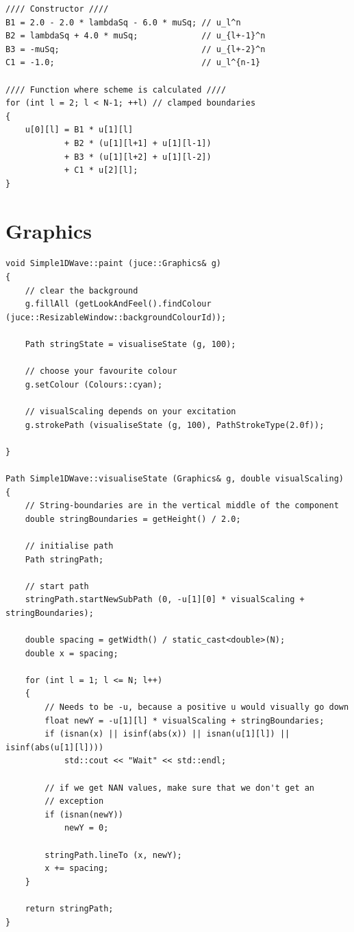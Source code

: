 \begin{lstlisting}[caption=Precalculation]
//// Constructor ////
B1 = 2.0 - 2.0 * lambdaSq - 6.0 * muSq; // u_l^n
B2 = lambdaSq + 4.0 * muSq;             // u_{l+-1}^n
B3 = -muSq;                             // u_{l+-2}^n
C1 = -1.0;                              // u_l^{n-1}

//// Function where scheme is calculated ////
for (int l = 2; l < N-1; ++l) // clamped boundaries
{
    u[0][l] = B1 * u[1][l]
            + B2 * (u[1][l+1] + u[1][l-1]) 
            + B3 * (u[1][l+2] + u[1][l-2])
            + C1 * u[2][l];
}
\end{lstlisting}

\section{Graphics}
\setlstCpp
\begin{lstlisting}
void Simple1DWave::paint (juce::Graphics& g)
{
    // clear the background
    g.fillAll (getLookAndFeel().findColour (juce::ResizableWindow::backgroundColourId));
    
    Path stringState = visualiseState (g, 100);
    
    // choose your favourite colour
    g.setColour (Colours::cyan);
    
    // visualScaling depends on your excitation
    g.strokePath (visualiseState (g, 100), PathStrokeType(2.0f));
    
}

Path Simple1DWave::visualiseState (Graphics& g, double visualScaling)
{
    // String-boundaries are in the vertical middle of the component
    double stringBoundaries = getHeight() / 2.0;
    
    // initialise path
    Path stringPath;
    
    // start path
    stringPath.startNewSubPath (0, -u[1][0] * visualScaling + stringBoundaries);
    
    double spacing = getWidth() / static_cast<double>(N);
    double x = spacing;
    
    for (int l = 1; l <= N; l++)
    {
        // Needs to be -u, because a positive u would visually go down
        float newY = -u[1][l] * visualScaling + stringBoundaries;
        if (isnan(x) || isinf(abs(x)) || isnan(u[1][l]) || isinf(abs(u[1][l])))
            std::cout << "Wait" << std::endl;
        
        // if we get NAN values, make sure that we don't get an 
        // exception
        if (isnan(newY))
            newY = 0;
        
        stringPath.lineTo (x, newY);
        x += spacing;
    }
    
    return stringPath;
}
\end{lstlisting}
